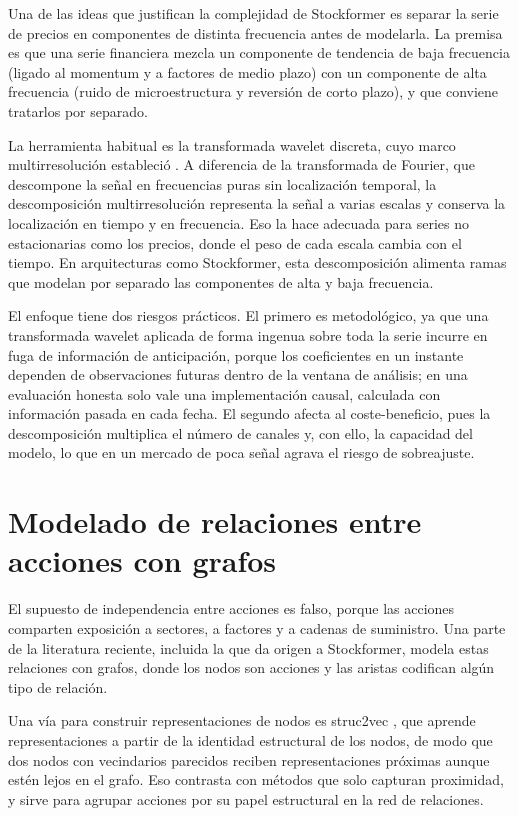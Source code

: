 Una de las ideas que justifican la complejidad de Stockformer es separar la serie de
precios en componentes de distinta frecuencia antes de modelarla. La premisa es que una
serie financiera mezcla un componente de tendencia de baja frecuencia (ligado al momentum
y a factores de medio plazo) con un componente de alta frecuencia (ruido de
microestructura y reversión de corto plazo), y que conviene tratarlos por separado.

La herramienta habitual es la transformada wavelet discreta, cuyo marco multirresolución
estableció \textcite{mallat1989theory}. A diferencia de la transformada de Fourier, que
descompone la señal en frecuencias puras sin localización temporal, la descomposición
multirresolución representa la señal a varias escalas y conserva la localización en tiempo
y en frecuencia. Eso la hace adecuada para series no estacionarias como los precios, donde
el peso de cada escala cambia con el tiempo. En arquitecturas como Stockformer, esta
descomposición alimenta ramas que modelan por separado las componentes de alta y baja
frecuencia.

El enfoque tiene dos riesgos prácticos. El primero es metodológico, ya que una transformada
wavelet aplicada de forma ingenua sobre toda la serie incurre en fuga de información de
anticipación, porque los coeficientes en un instante dependen de observaciones futuras
dentro de la ventana de análisis; en una evaluación honesta solo vale una implementación
causal, calculada con información pasada en cada fecha. El segundo afecta al
coste-beneficio, pues la descomposición multiplica el número de canales y, con ello, la
capacidad del modelo, lo que en un mercado de poca señal agrava el riesgo de sobreajuste.

\section{Modelado de relaciones entre acciones con grafos}

El supuesto de independencia entre acciones es falso, porque las acciones comparten exposición a
sectores, a factores y a cadenas de suministro. Una parte de la literatura reciente,
incluida la que da origen a Stockformer, modela estas relaciones con grafos, donde los
nodos son acciones y las aristas codifican algún tipo de relación.

Una vía para construir representaciones de nodos es struc2vec
\parencite{ribeiro2017struc2vec}, que aprende representaciones a partir de la identidad
estructural de los nodos, de modo que dos nodos con vecindarios parecidos reciben
representaciones próximas aunque estén lejos en el grafo. Eso contrasta con métodos que
solo capturan proximidad, y sirve para agrupar acciones por su papel estructural en la red
de relaciones.

